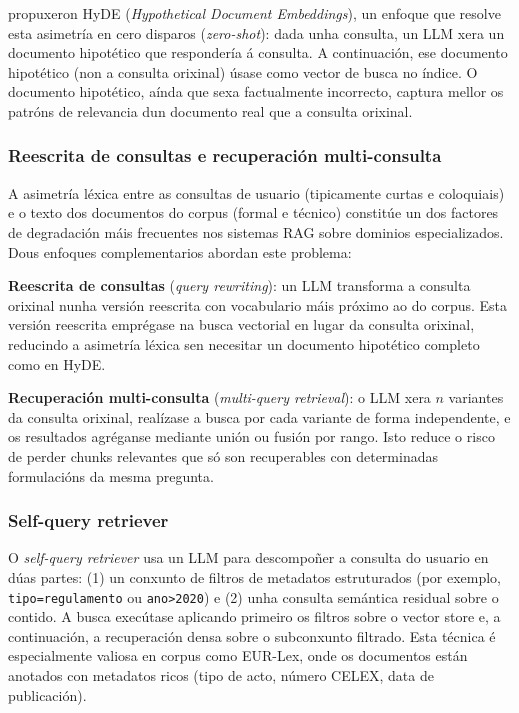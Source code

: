 \documentclass[11pt, a4paper, oneside]{report}
\begin{document}
\citet{gao2022precise} propuxeron HyDE (\textit{Hypothetical Document Embeddings}),
un enfoque que resolve esta asimetría en cero disparos (\textit{zero-shot}): dada
unha consulta, un LLM xera un documento hipotético que respondería á consulta.
A continuación, ese documento hipotético (non a consulta orixinal) úsase como vector de
busca no índice. O documento hipotético, aínda que sexa factualmente incorrecto, captura
mellor os patróns de relevancia dun documento real que a consulta orixinal.

\subsubsection{Reescrita de consultas e recuperación multi-consulta}
\label{sec:query_rewriting_teoria}

A asimetría léxica entre as consultas de usuario (tipicamente curtas e coloquiais) e
o texto dos documentos do corpus (formal e técnico) constitúe un dos factores de
degradación máis frecuentes nos sistemas RAG sobre dominios especializados. Dous
enfoques complementarios abordan este problema:

\textbf{Reescrita de consultas} (\textit{query rewriting}): un LLM transforma a
consulta orixinal nunha versión reescrita con vocabulario máis próximo ao do corpus.
Esta versión reescrita emprégase na busca vectorial en lugar da consulta orixinal,
reducindo a asimetría léxica sen necesitar un documento hipotético completo como en
HyDE.

\textbf{Recuperación multi-consulta} (\textit{multi-query retrieval}): o LLM xera
$n$ variantes da consulta orixinal, realízase a busca por cada variante de forma
independente, e os resultados agréganse mediante unión ou fusión por rango. Isto
reduce o risco de perder chunks relevantes que só son recuperables con determinadas
formulacións da mesma pregunta.

\subsubsection{Self-query retriever}
\label{sec:selfquery_teoria}

O \textit{self-query retriever} \citep{langchain2022} usa un LLM para descompoñer a
consulta do usuario en dúas partes: (1) un conxunto de filtros de metadatos
estruturados (por exemplo, \texttt{tipo=regulamento} ou \texttt{ano>2020}) e (2) unha
consulta semántica residual sobre o contido. A busca execútase aplicando primeiro os
filtros sobre o vector store e, a continuación, a recuperación densa sobre o
subconxunto filtrado. Esta técnica é especialmente valiosa en corpus como EUR-Lex,
onde os documentos están anotados con metadatos ricos (tipo de acto, número CELEX,
data de publicación).
\end{document}
